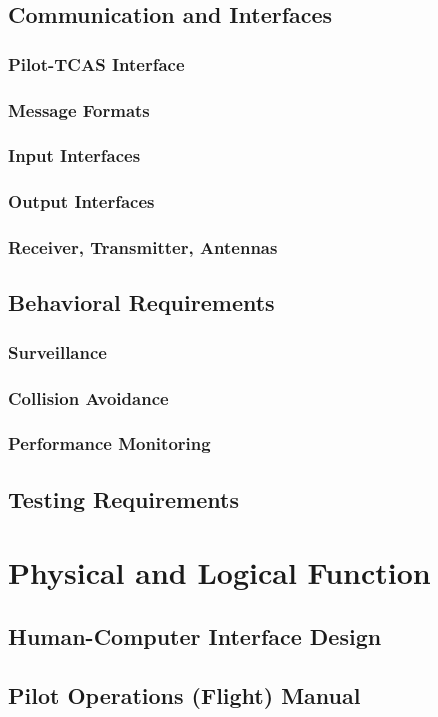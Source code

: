 \documentclass[12pt]{report}
\begin{document}
\section{Communication and Interfaces}
\subsection{Pilot-TCAS Interface}
\subsection{Message Formats}
\subsection{Input Interfaces}
\subsection{Output Interfaces}
\subsection{Receiver, Transmitter, Antennas}
\section{Behavioral Requirements}
\subsection{Surveillance}
\subsection{Collision Avoidance}
\subsection{Performance Monitoring}
\section{Testing Requirements}

\chapter{Physical and Logical Function}
\section{Human-Computer Interface Design}
\section{Pilot Operations (Flight) Manual}
\end{document}

